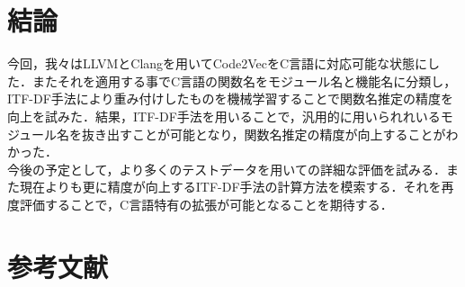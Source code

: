 \documentclass[submit,techrep,noauthor]{ipsj}
\begin{document}
\section{結論}
今回，我々はLLVMとClangを用いてCode2VecをC言語に対応可能な状態にした．またそれを適用する事でC言語の関数名をモジュール名と機能名に分類し，ITF-DF手法により重み付けしたものを機械学習することで関数名推定の精度を向上を試みた．結果，ITF-DF手法を用いることで，汎用的に用いられれいるモジュール名を抜き出すことが可能となり，関数名推定の精度が向上することがわかった．\\
今後の予定として，より多くのテストデータを用いての詳細な評価を試みる．また現在よりも更に精度が向上するITF-DF手法の計算方法を模索する．それを再度評価することで，C言語特有の拡張が可能となることを期待する．



\section{参考文献}
















\end{document}
